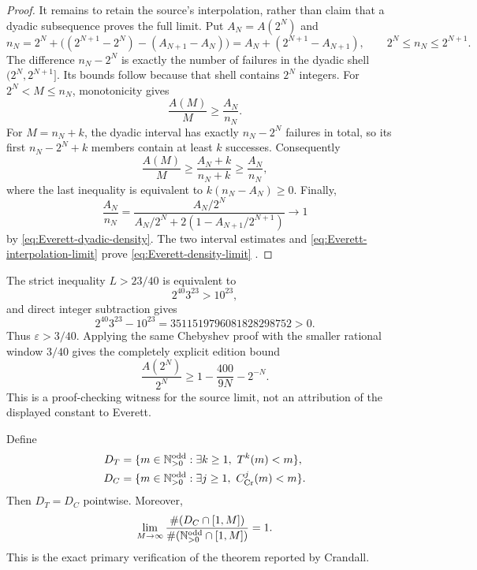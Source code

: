 \begin{proof}
It remains to retain the source's interpolation, rather than claim that a
dyadic subsequence proves the full limit.  Put \(A_N=A(2^N)\) and
\begin{equation}
\label{eq:Everett-nN}
 n_N
 =2^N+\bigl((2^{N+1}-2^N)-(A_{N+1}-A_N)\bigr)
 =A_N+(2^{N+1}-A_{N+1}),
 \qquad 2^N\le n_N\le2^{N+1}.
\end{equation}
The difference \(n_N-2^N\) is exactly the number of failures in the dyadic
shell \((2^N,2^{N+1}]\).  Its bounds follow because that shell contains
\(2^N\) integers.
For \(2^N<M\le n_N\), monotonicity gives
\[
 \frac{A(M)}M\ge\frac{A_N}{n_N}.
\]
For \(M=n_N+k\), the dyadic interval has exactly
\(n_N-2^N\) failures in total, so its first
\(n_N-2^N+k\) members contain at least \(k\) successes.  Consequently
\[
 \frac{A(M)}M
 \ge\frac{A_N+k}{n_N+k}
 \ge\frac{A_N}{n_N},
\]
where the last inequality is equivalent to \(k(n_N-A_N)\ge0\).  Finally,
\begin{equation}
\label{eq:Everett-interpolation-limit}
 \frac{A_N}{n_N}
 =\frac{A_N/2^N}
 {A_N/2^N+2(1-A_{N+1}/2^{N+1})}\longrightarrow1
\end{equation}
by \eqref{eq:Everett-dyadic-density}.  The two interval estimates and
\eqref{eq:Everett-interpolation-limit} prove
\eqref{eq:Everett-density-limit}
\cite[pp.~44--45, Eqs.~(5)--(12) and Thm.~2]{Everett1977}.
\end{proof}

\begin{calculation}
\label{calc:Everett-rational-bound}
The strict inequality \(L>23/40\) is equivalent to
\[
 2^{40}3^{23}>10^{23},
\]
and direct integer subtraction gives
\[
 2^{40}3^{23}-10^{23}=3511519796081828298752>0.
\]
Thus \(\varepsilon>3/40\).  Applying the same Chebyshev proof with the
smaller rational window \(3/40\) gives the completely explicit edition
bound
\begin{equation}
\label{eq:Everett-rational-density-bound}
 \frac{A(2^N)}{2^N}
 \ge1-\frac{400}{9N}-2^{-N}.
\end{equation}
This is a proof-checking witness for the source limit, not an attribution of
the displayed constant to Everett.
\end{calculation}

\begin{proposition}
\label{prop:Everett-Crandall-crosswalk}
Define
\begin{align*}
 D_T&=\{m\in\mathbb{N}_{>0}^{\mathrm{odd}}:\exists k\ge1,\ T^k(m)<m\},\\
 D_C&=\{m\in\mathbb{N}_{>0}^{\mathrm{odd}}:\exists j\ge1,\ C_{\mathrm{Cr}}^j(m)<m\}.
\end{align*}
Then \(D_T=D_C\) pointwise.  Moreover,
\begin{equation}
\label{eq:Everett-Crandall-relative-density}
 \lim_{M\to\infty}
 \frac{\#(D_C\cap[1,M])}{\#(\mathbb{N}_{>0}^{\mathrm{odd}}\cap[1,M])}=1.
\end{equation}
This is the exact primary verification of the theorem reported by Crandall.
\end{proposition}

